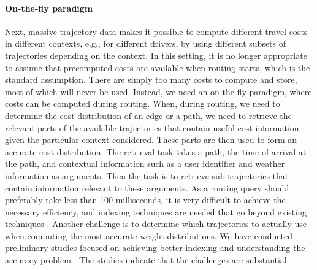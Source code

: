 \documentclass[11pt]{article}
\begin{document}
\paragraph{On-the-fly paradigm} Next, massive trajectory data makes it possible to compute different travel costs in different contexts, e.g., for different drivers, by using different subsets of trajectories depending on the context. In this setting, it is no longer appropriate to assume that precomputed costs are available when routing starts, which is the standard assumption. There are simply too many costs to compute and store, most of which will never be used. Instead, we need an on-the-fly paradigm, where costs can be computed during routing. When, during routing, we need to determine the cost distribution of an edge or a path, we need to retrieve the relevant parts of the available trajectories that contain useful cost information given the particular context considered. These parts are then used to form an accurate cost distribution. The retrieval task takes a path, the time-of-arrival at the path, and contextual information such as a user identifier and weather information as arguments. Then the task is to retrieve sub-trajectories that contain information relevant to these arguments. As a routing query should preferably take less than 100 milliseconds, it is very difficult to achieve the necessary efficiency, and indexing techniques are needed that go beyond existing techniques \cite{7,8,9}. Another challenge is to determine which trajectories to actually use when computing the most accurate weight distributions. We have conducted preliminary studies focused on achieving better indexing \cite{91} and understanding the accuracy problem \cite{10,11}. The studies indicate that the challenges are substantial.
\end{document}
